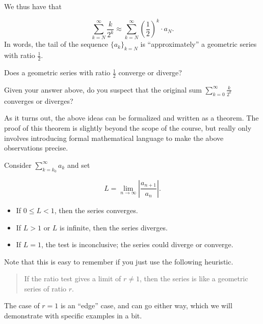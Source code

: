 \documentclass{ximera}
\begin{document}
\begin{exploration}
We thus have that 

\[
\sum_{k=N}^{\infty}  \frac{k}{2^k} \approx \sum_{k=N}^{\infty} \left(\frac{1}{2}\right)^k \cdot a_N.
\]
In words, the tail of the sequence $\{a_k\}_{k=N}$ is ``approximately'' a geometric series with ratio $\frac{1}{2}$.

\begin{question}
Does a geometric series with ratio $\frac{1}{2}$ converge or diverge?
\begin{prompt}
  \begin{multipleChoice}
  \end{multipleChoice}
\end{prompt}
\begin{question}
  Given your answer above, do you suspect that the original sum
  $\sum_{k=0}^\infty \frac{k}{2^k}$ converges or diverges?
  \begin{prompt}
    \begin{multipleChoice}
    \end{multipleChoice}
  \end{prompt}
\end{question}
\end{question}
\end{exploration}

As it turns out, the above ideas can be formalized and written as a theorem.  The proof of
this theorem is slightly beyond the scope of the course, but really only involves introducing formal mathematical language to make the above observations precise.

\begin{theorem}
Consider $\sum_{k=k_0}^\infty a_k$ and set 

\[
L = \lim_{n \to \infty} \left| \frac{a_{n+1}}{a_n} \right|. 
\]

\begin{itemize}
  \item If $0 \leq L < 1$, then the series converges.
  \item If $L>1$ or $L$ is infinite, then the series diverges.
  \item If $L = 1$, the test is inconclusive; the series could diverge or converge.
  \end{itemize}
\end{theorem}

Note that this is easy to remember if you just use the following heuristic.
\begin{quote}
  If the ratio test gives a limit of $r \neq 1 $, then the series is like a
  geometric series of ratio $r$.
\end{quote}
The case of $r=1$ is an ``edge'' case, and can go either way, which we will demonstrate with specific examples in a bit.
\end{document}
